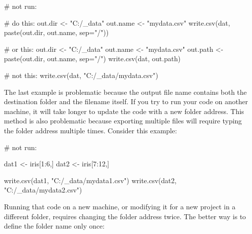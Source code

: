 \documentclass[
  13,
  letterpaper,
]{report}
\newenvironment{Shaded}{\begin{snugshade}}{\end{snugshade}}
\newcommand{\AttributeTok}[1]{\textcolor[rgb]{0.40,0.45,0.13}{#1}}
\newcommand{\CommentTok}[1]{\textcolor[rgb]{0.37,0.37,0.37}{#1}}
\newcommand{\DecValTok}[1]{\textcolor[rgb]{0.68,0.00,0.00}{#1}}
\newcommand{\FunctionTok}[1]{\textcolor[rgb]{0.28,0.35,0.67}{#1}}
\newcommand{\NormalTok}[1]{\textcolor[rgb]{0.00,0.23,0.31}{#1}}
\newcommand{\OtherTok}[1]{\textcolor[rgb]{0.00,0.23,0.31}{#1}}
\newcommand{\SpecialCharTok}[1]{\textcolor[rgb]{0.37,0.37,0.37}{#1}}
\newcommand{\StringTok}[1]{\textcolor[rgb]{0.13,0.47,0.30}{#1}}
\begin{document}
\begin{Shaded}
\begin{Highlighting}[]
\CommentTok{\# not run:}

\CommentTok{\# do this:}
\NormalTok{out.dir }\OtherTok{\textless{}{-}} \StringTok{"C:/\_data"}
\NormalTok{out.name }\OtherTok{\textless{}{-}} \StringTok{"mydata.csv"}
\FunctionTok{write.csv}\NormalTok{(dat, }\FunctionTok{paste}\NormalTok{(out.dir, out.name, }\AttributeTok{sep=}\StringTok{"/"}\NormalTok{))}

\CommentTok{\# or this:}
\NormalTok{out.dir }\OtherTok{\textless{}{-}} \StringTok{"C:/\_data"}
\NormalTok{out.name }\OtherTok{\textless{}{-}} \StringTok{"mydata.csv"}
\NormalTok{out.path }\OtherTok{\textless{}{-}} \FunctionTok{paste}\NormalTok{(out.dir, out.name, }\AttributeTok{sep=}\StringTok{"/"}\NormalTok{)}
\FunctionTok{write.csv}\NormalTok{(dat, out.path)}

\CommentTok{\# not this:}
\FunctionTok{write.csv}\NormalTok{(dat, }\StringTok{"C:/\_data/mydata.csv"}\NormalTok{)}
\end{Highlighting}
\end{Shaded}

The last example is problematic because the output file name contains
both the destination folder and the filename itself. If you try to run
your code on another machine, it will take longer to update the code
with a new folder address. This method is also problematic because
exporting multiple files will require typing the folder address multiple
times. Consider this example:

\begin{Shaded}
\begin{Highlighting}[]
\CommentTok{\# not run:}

\NormalTok{dat1 }\OtherTok{\textless{}{-}}\NormalTok{ iris[}\DecValTok{1}\SpecialCharTok{:}\DecValTok{6}\NormalTok{,]}
\NormalTok{dat2 }\OtherTok{\textless{}{-}}\NormalTok{ iris[}\DecValTok{7}\SpecialCharTok{:}\DecValTok{12}\NormalTok{,]}

\FunctionTok{write.csv}\NormalTok{(dat1, }\StringTok{"C:/\_data/mydata1.csv"}\NormalTok{)}
\FunctionTok{write.csv}\NormalTok{(dat2, }\StringTok{"C:/\_data/mydata2.csv"}\NormalTok{)}
\end{Highlighting}
\end{Shaded}

Running that code on a new machine, or modifying it for a new project in
a different folder, requires changing the folder address twice. The
better way is to define the folder name only once:
\end{document}
